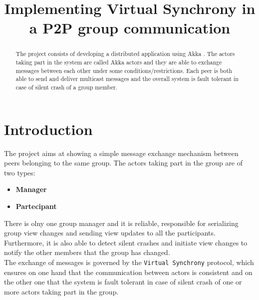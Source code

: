\documentclass[conference]{IEEEtran}
\begin{document}
\title{Implementing Virtual Synchrony in a P2P group communication}

\author{
}

\maketitle

\begin{abstract}
The project consists of developing a distributed application using Akka \cite{Akka}. The actors
taking part in the system are called Akka actors and they are able
to exchange messages between each other under some conditions/restrictions.
Each peer is both able to send and deliver multicast messages and 
the overall system is fault tolerant in case of silent crash of
a group member.   

\end{abstract}

\section{Introduction}
\label{sec:introduction}
The project aims at showing a simple message exchange mechanism between
peers belonging to the same group. The actors taking part in the group
are of two types:
\begin{itemize}
	\item \textbf{Manager}
	\item \textbf{Partecipant}
\end{itemize} 
There is olny one group manager and it is reliable, responsible for serializing group view
changes and sending view updates to all the participants. 
Furthermore, it is also able to detect silent crashes and initiate view
changes to notify the other members that the group has changed.\\
The exchange of messages is governed by the \texttt{Virtual Synchrony}
protocol, which ensures on one hand that the communication between actors is
consistent and on the other one that the system is fault tolerant 
in case of silent crash of one or more actors taking part in the group.
\end{document}
